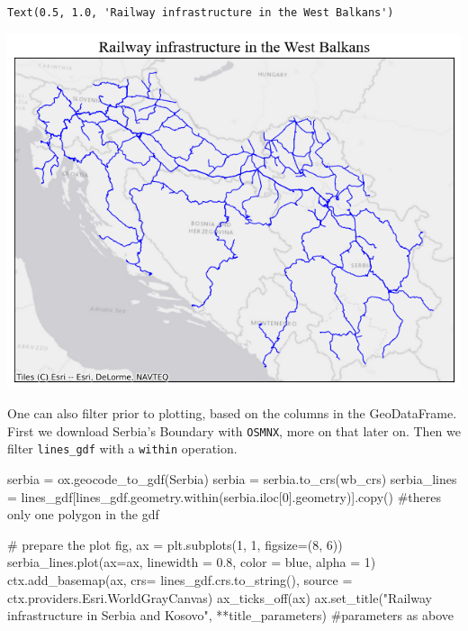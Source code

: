 \documentclass[
  letterpaper,
  DIV=11,
  numbers=noendperiod]{scrreprt}
\newenvironment{Shaded}{\begin{snugshade}}{\end{snugshade}}
\newcommand{\CommentTok}[1]{\textcolor[rgb]{0.37,0.37,0.37}{#1}}
\newcommand{\DecValTok}[1]{\textcolor[rgb]{0.68,0.00,0.00}{#1}}
\newcommand{\FloatTok}[1]{\textcolor[rgb]{0.68,0.00,0.00}{#1}}
\newcommand{\NormalTok}[1]{\textcolor[rgb]{0.00,0.23,0.31}{#1}}
\newcommand{\OperatorTok}[1]{\textcolor[rgb]{0.37,0.37,0.37}{#1}}
\newcommand{\StringTok}[1]{\textcolor[rgb]{0.13,0.47,0.30}{#1}}
\begin{document}
\begin{verbatim}
Text(0.5, 1.0, 'Railway infrastructure in the West Balkans')
\end{verbatim}

\includegraphics{labs/w02_maps_files/figure-pdf/cell-11-output-2.png}

One can also filter prior to plotting, based on the columns in the
GeoDataFrame. First we download Serbia's Boundary with \texttt{OSMNX},
more on that later on. Then we filter \texttt{lines\_gdf} with a
\texttt{within} operation.

\begin{Shaded}
\begin{Highlighting}[]
\NormalTok{serbia }\OperatorTok{=}\NormalTok{ ox.geocode\_to\_gdf(}\StringTok{\textquotesingle{}Serbia\textquotesingle{}}\NormalTok{)}
\NormalTok{serbia }\OperatorTok{=}\NormalTok{ serbia.to\_crs(wb\_crs)}
\NormalTok{serbia\_lines }\OperatorTok{=}\NormalTok{ lines\_gdf[lines\_gdf.geometry.within(serbia.iloc[}\DecValTok{0}\NormalTok{].geometry)].copy() }\CommentTok{\#there\textquotesingle{}s only one polygon in the gdf}
\end{Highlighting}
\end{Shaded}

\begin{Shaded}
\begin{Highlighting}[]
\CommentTok{\# prepare the plot}
\NormalTok{fig, ax }\OperatorTok{=}\NormalTok{ plt.subplots(}\DecValTok{1}\NormalTok{, }\DecValTok{1}\NormalTok{, figsize}\OperatorTok{=}\NormalTok{(}\DecValTok{8}\NormalTok{, }\DecValTok{6}\NormalTok{))}
\NormalTok{serbia\_lines.plot(ax}\OperatorTok{=}\NormalTok{ax, linewidth }\OperatorTok{=} \FloatTok{0.8}\NormalTok{, color }\OperatorTok{=} \StringTok{\textquotesingle{}blue\textquotesingle{}}\NormalTok{, alpha }\OperatorTok{=} \DecValTok{1}\NormalTok{)}
\NormalTok{ctx.add\_basemap(ax, crs}\OperatorTok{=}\NormalTok{ lines\_gdf.crs.to\_string(), source }\OperatorTok{=}\NormalTok{ ctx.providers.Esri.WorldGrayCanvas)}
\NormalTok{ax\_ticks\_off(ax)}
\NormalTok{ax.set\_title(}\StringTok{"Railway infrastructure in Serbia and Kosovo"}\NormalTok{, }\OperatorTok{**}\NormalTok{title\_parameters) }\CommentTok{\#parameters as above}
\end{Highlighting}
\end{Shaded}
\end{document}
